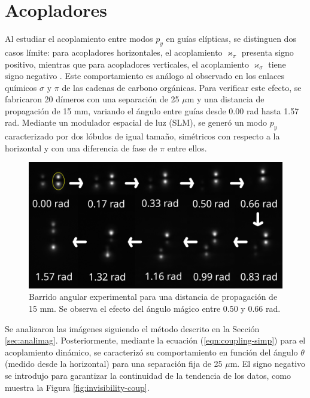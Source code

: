 \section{Acopladores}
Al estudiar el acoplamiento entre modos $p_y$ en guías elípticas, se distinguen dos casos límite: para acopladores horizontales, el acoplamiento $\varkappa_\pi$ presenta signo positivo, mientras que para acopladores verticales, el acoplamiento $\varkappa_\sigma$ tiene signo negativo \cite{Pmodecoupling}.
Este comportamiento es análogo al observado en los enlaces químicos $\sigma$ y $\pi$ de las cadenas de carbono orgánicas. Para verificar este efecto, se fabricaron 20 dímeros con una separación de 25 $\mu$m y una distancia de propagación de 15 mm, variando el ángulo entre guías desde 0.00 rad hasta 1.57 rad. Mediante un modulador espacial de luz (SLM), se generó un modo $p_y$ caracterizado por dos lóbulos de igual tamaño, simétricos con respecto a la horizontal y con una diferencia de fase de $\pi$ entre ellos.
\begin{figure}[H]
    \centering
    \includegraphics[width=0.7\linewidth]{media/26um_15mm_angles_v2.png}
    \caption[Barrido angular experimental]{Barrido angular experimental para una distancia de propagación de 15 mm. Se observa el efecto del ángulo mágico entre 0.50 y 0.66 rad. \label{fig:angulobarrido}}
\end{figure} \vspace{-2ex} Se analizaron las imágenes siguiendo el método descrito en la Sección \ref{sec:analimag}. Posteriormente, mediante la ecuación (\ref{eqn:coupling-simp}) para el acoplamiento dinámico, se caracterizó su comportamiento en función del ángulo $\theta$ (medido desde la horizontal) para una separación fija de 25 $\mu$m. El signo negativo se introdujo para garantizar la continuidad de la tendencia de los datos, como muestra la Figura \ref{fig:invisibility-coup}.
